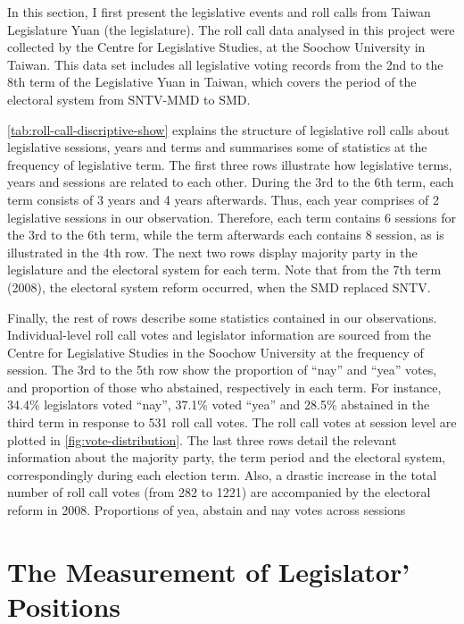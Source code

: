 In this section, I first present the legislative events and roll calls from Taiwan Legislature Yuan (the legislature). The roll call data analysed in this project were collected by the Centre for Legislative Studies, at the Soochow University in Taiwan. This data set includes all legislative voting records from the 2nd to the 8th term of the Legislative Yuan in Taiwan, which covers the period of the electoral system from SNTV-MMD to SMD. 



\autoref{tab:roll-call-discriptive-show} explains the structure of legislative roll calls about legislative sessions, years and terms and summarises some of statistics at the frequency of legislative term. The first three rows illustrate how legislative terms, years and sessions are related to each other. During the 3rd to the 6th term, each term consists of 3 years and 4 years afterwards. Thus, each year comprises of 2 legislative sessions in our observation. Therefore, each term contains 6 sessions for the 3rd to the 6th term, while the term afterwards each contains 8 session, as is illustrated in the 4th row. The next two rows display majority party in the legislature and the electoral system for each term. Note that from the 7th term (2008), the electoral system reform occurred, when the SMD replaced SNTV. 

Finally, the rest of rows describe some statistics contained in our observations. Individual-level roll call votes and legislator information are sourced from the Centre for Legislative Studies in the Soochow University at the frequency of session. The 3rd to the 5th row show the proportion of ``nay'' and ``yea'' votes, and proportion of those who abstained, respectively in each term. For instance, 34.4\% legislators voted “nay”, 37.1\% voted ``yea'' and 28.5\% abstained in the third term in response to 531 roll call votes. The roll call votes at session level are plotted in \autoref{fig:vote-distribution}. The last three rows detail the relevant information about the majority party, the term period and the electoral system, correspondingly during each election term. Also, a drastic increase in the total number of roll call votes (from 282 to 1221) are accompanied by the electoral reform in 2008. Proportions of yea, abstain and nay votes across sessions



\section*{\centering The Measurement of Legislator' Positions}


